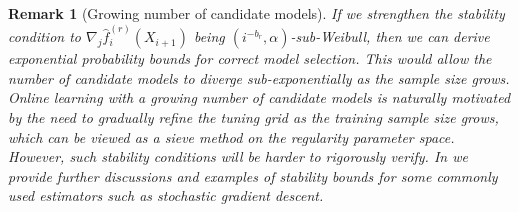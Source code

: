 \documentclass[11pt]{article}
\theoremstyle{plain}
\newtheorem{remark}[theorem]{Remark}
\newcommand{\D}{{\mathcal{D}}}
\newcommand{\X}{{\mathcal{X}}}
\begin{document}

\begin{remark}[Growing number of candidate models]\label{rem:3.3-growing-M}
 If we strengthen the stability condition to $\nabla_j\hat f^{(r)}_i(X_{i+1})$ being $(i^{-b_r},\alpha)$-sub-Weibull, then we can derive exponential probability bounds for correct model selection. This would allow the number of candidate models to diverge sub-exponentially as the sample size grows.  Online learning with a growing number of candidate models is naturally motivated by the need to gradually refine the tuning grid as the training sample size grows, which can be viewed as a sieve method on the regularity parameter space.    However, such stability conditions will be harder to rigorously verify.  In  we provide further discussions and examples of stability bounds for some commonly used estimators such as stochastic gradient descent.
\end{remark}
 
\end{document}

